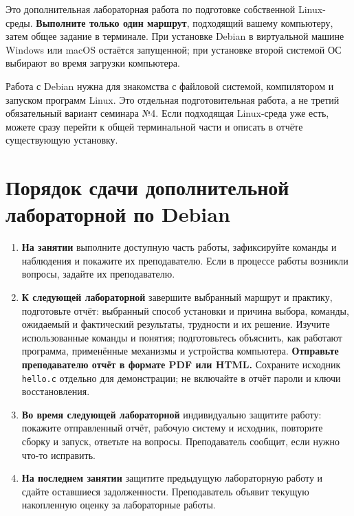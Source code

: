 Это дополнительная лабораторная работа по подготовке собственной
Linux-среды. \textbf{Выполните только один маршрут}, подходящий вашему
компьютеру, затем общее задание в терминале. При установке Debian в
виртуальной машине Windows или macOS остаётся запущенной; при установке
второй системой ОС выбирают во время загрузки компьютера.

Работа с Debian нужна для знакомства с файловой системой, компилятором и
запуском программ Linux. Это отдельная подготовительная работа, а не
третий обязательный вариант семинара №4. Если подходящая Linux-среда уже
есть, можете сразу перейти к общей терминальной части и описать в отчёте
существующую установку.

\hypertarget{ux43fux43eux440ux44fux434ux43eux43a-ux441ux434ux430ux447ux438-ux434ux43eux43fux43eux43bux43dux438ux442ux435ux43bux44cux43dux43eux439-ux43bux430ux431ux43eux440ux430ux442ux43eux440ux43dux43eux439-ux43fux43e-debian}{%
\section{Порядок сдачи дополнительной лабораторной по
Debian}\label{ux43fux43eux440ux44fux434ux43eux43a-ux441ux434ux430ux447ux438-ux434ux43eux43fux43eux43bux43dux438ux442ux435ux43bux44cux43dux43eux439-ux43bux430ux431ux43eux440ux430ux442ux43eux440ux43dux43eux439-ux43fux43e-debian}}

\begin{enumerate}
\def\labelenumi{\arabic{enumi}.}
\tightlist
\item
  \textbf{На занятии} выполните доступную часть работы, зафиксируйте
  команды и наблюдения и покажите их преподавателю. Если в процессе
  работы возникли вопросы, задайте их преподавателю.
\item
  \textbf{К следующей лабораторной} завершите выбранный маршрут и
  практику, подготовьте отчёт: выбранный способ установки и причина
  выбора, команды, ожидаемый и фактический результаты, трудности и их
  решение. Изучите использованные команды и понятия; подготовьтесь
  объяснить, как работают программа, применённые механизмы и устройства
  компьютера. \textbf{Отправьте преподавателю отчёт в формате PDF или
  HTML.} Сохраните исходник \texttt{hello.c} отдельно для демонстрации;
  не включайте в отчёт пароли и ключи восстановления.
\item
  \textbf{Во время следующей лабораторной} индивидуально защитите
  работу: покажите отправленный отчёт, рабочую систему и исходник,
  повторите сборку и запуск, ответьте на вопросы. Преподаватель сообщит,
  если нужно что-то исправить.
\item
  \textbf{На последнем занятии} защитите предыдущую лабораторную работу
  и сдайте оставшиеся задолженности. Преподаватель объявит текущую
  накопленную оценку за лабораторные работы.
\end{enumerate}

